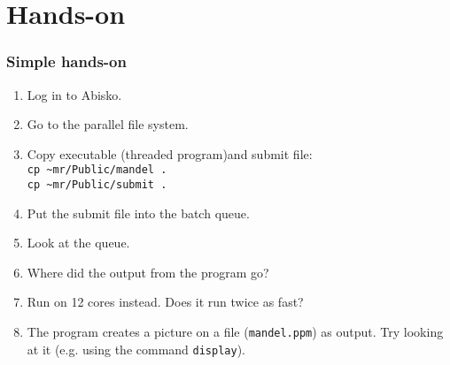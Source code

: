 %

\section{Hands-on}



\begin{frame}
	\frametitle{Simple hands-on}
  
	\begin{enumerate}
		\item	Log in to Abisko.
		\item	Go to the parallel file system.
		\item	Copy executable (threaded program)and submit file:\\
				\texttt{cp \~{}mr/Public/mandel .}\\
				\texttt{cp \~{}mr/Public/submit .}
		\item	Put the submit file into the batch queue.
		\item	Look at the queue.
		\item	Where did the output from the program go?
		\item	Run on 12 cores instead.
				Does it run twice as fast?
		\item	The program creates a picture on a file (\texttt{mandel.ppm})
				as output.
				Try looking at it (e.g. using the command \texttt{display}).
	\end{enumerate}

\end{frame}

